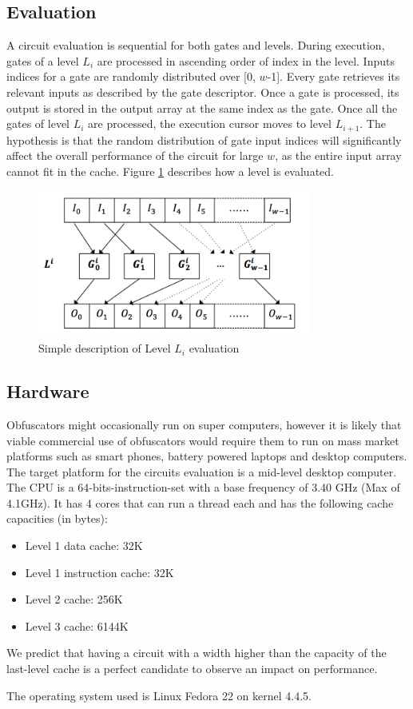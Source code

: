 \subsection{Evaluation}
A circuit evaluation is sequential for both gates and levels. During execution,
gates of a level $L_i$ are processed in ascending order of index in the level.
Inputs indices for a gate are randomly distributed over [0, $w$-1]. Every gate
retrieves its relevant inputs as described by the gate descriptor. Once a gate is
processed, its output is stored in the output array at the same index as the gate.
Once all the gates of level $L_i$ are processed, the execution cursor moves to
level $L_{i+1}$. The hypothesis is that the random distribution of gate input
indices will significantly affect the overall performance of the circuit for
large $w$, as the entire input array cannot fit in the cache. Figure \ref{fig:level}
describes how a level is evaluated.
\begin{figure}[h]
	\center
	\includegraphics[width=0.8\textwidth]{img/level.png}
	\caption{Simple description of Level $L_i$ evaluation}
	\label{fig:level}
\end{figure}
\par
\subsection{Hardware}
Obfuscators might occasionally run on super computers, however it is likely that
viable commercial use of obfuscators would require them to run on mass market
platforms such as smart phones, battery powered laptops and desktop computers\cite{clark}.
The target platform for the circuits evaluation is a mid-level desktop computer.
The CPU is a 64-bits-instruction-set with a base frequency of 3.40 GHz (Max of 4.1GHz).
It has 4 cores that can run a thread each and has the following cache capacities (in bytes):
\begin{itemize}[noitemsep]
\item Level 1 data cache: 32K
\item Level 1 instruction cache: 32K
\item Level 2 cache: 256K
\item Level 3 cache: 6144K
\end{itemize}
We predict that having a circuit with a width higher than the capacity of the
last-level cache is a perfect candidate to observe an impact on performance.
\par
The operating system used is Linux Fedora 22 on kernel 4.4.5.


